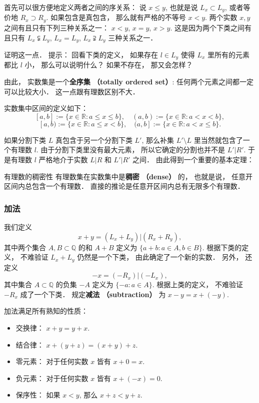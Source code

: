 首先可以很方便地定义两者之间的序关系： 说 $x\leq y$, 也就是说 $L_x\subset L_y$, 或者等价地 $R_x\supset R_y$. 如果包含是真包含， 那么就有严格的不等号 $x<y$. 两个实数 $x,y$ 之间有且只有下列三种关系之一： $x<y$, $x=y$, $x>y$. 这是因为两个下类之间有且只有 $L_x\subsetneqq L_y$, $L_x=L_y$, $L_x\supsetneqq L_y$ 三种关系之一．

\begin{exercise}{}
证明这一点． 提示： 回看下类的定义， 如果存在 $l\in L_y$ 使得 $L_x$ 里所有的元素都比 $l$ 小， 那么可以说明什么？ 如果不存在， 那又会怎样？
\end{exercise}

由此， 实数集是一个\textbf{全序集 （totally ordered set）}: 任何两个元素之间都一定可以比较大小． 这一点跟有理数区别不大．

实数集中区间的定义如下： 
$$
[a,b]:=\{x\in\mathbb{R}:a\leq x\leq b\},
\quad
(a,b):=\{x\in\mathbb{R}:a< x< b\},
$$
$$
[a,b):=\{x\in\mathbb{R}:a\leq x< b\},
\quad
(a,b]:=\{x\in\mathbb{R}:a< x\leq b\}.
$$

如果分割下类 $L$ 真包含于另一个分割下类 $L'$, 那么补集 $L'\setminus L$ 里当然就包含了一个有理数 $l$. 由于分割下类里没有最大元素， 所以它确定的分割也并不是 $L'|R'$. 于是有理数 $l$ 严格地介于实数 $L|R$ 和 $L'|R'$ 之间． 由此得到一个重要的基本定理：
\begin{theorem}{有理数的稠密性}
有理数集在实数集中是\textbf{稠密 （dense）} 的， 也就是说， 任意开区间内总包含一个有理数． 直接的推论是任意开区间内总有无限多个有理数．
\end{theorem}

\subsubsection{加法}

我们定义
$$
x+y=(L_x+L_y)|(R_x+R_y),
$$
其中两个集合 $A,B\subset\mathbb{Q}$ 的和 $A+B$ 定义为 $\{a+b:a\in A, b\in B\}$. 根据下类的定义， 不难验证 $L_x+L_y$ 仍然是一个下类， 由此确定了一个新的实数． 另外， 还定义
$$
-x=(-R_x)|(-L_x),
$$
其中集合 $A\subset\mathbb{Q}$ 的负集 $-A$ 定义为 $\{-a:a\in A\}$. 根据上类的定义， 不难验证 $-R_x$ 成了一个下类． 规定\textbf{减法 （subtraction）} 为 $x-y=x+(-y)$.

加法满足所有熟知的性质：

\begin{itemize}
\item 交换律： $x+y=y+x$.
\item 结合律： $x+(y+z)=(x+y)+z$.
\item 零元素： 对于任何实数 $x$ 皆有 $x+0=x$.
\item 负元素： 对于任何实数 $x$ 皆有 $x+(-x)=0$.
\item 保序性： 如果 $x<y$, 那么 $x+z<y+z$.
\end{itemize}

